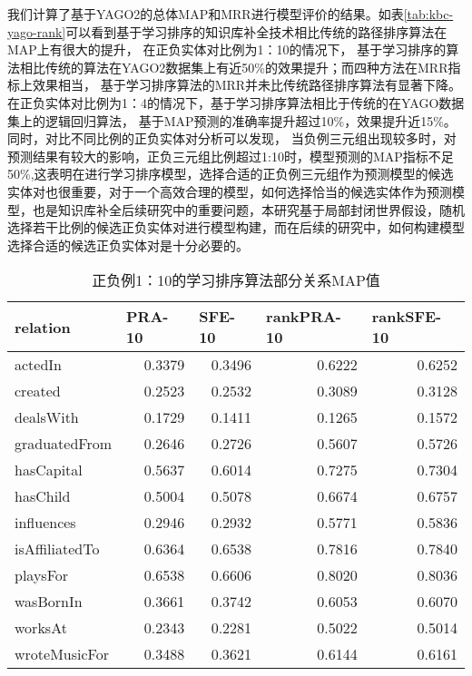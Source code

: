 我们计算了基于YAGO2的总体MAP和MRR进行模型评价的结果。如表\ref{tab:kbc-yago-rank}可以看到基于学习排序的知识库补全技术相比传统的路径排序算法在MAP上有很大的提升，
在正负实体对比例为1：10的情况下，
基于学习排序的算法相比传统的算法在YAGO2数据集上有近50\%的效果提升；而四种方法在MRR指标上效果相当，
基于学习排序算法的MRR并未比传统路径排序算法有显著下降。
在正负实体对比例为1：4的情况下，基于学习排序算法相比于传统的在YAGO数据集上的逻辑回归算法，
基于MAP预测的准确率提升超过10\%，效果提升近15\%。同时，对比不同比例的正负实体对分析可以发现，
当负例三元组出现较多时，对预测结果有较大的影响，正负三元组比例超过1:10时，模型预测的MAP指标不足50\%,这表明在进行学习排序模型，选择合适的正负例三元组作为预测模型的候选实体对也很重要，对于一个高效合理的模型，如何选择恰当的候选实体作为预测模型，也是知识库补全后续研究中的重要问题，本研究基于局部封闭世界假设，随机选择若干比例的候选正负实体对进行模型构建，而在后续的研究中，如何构建模型选择合适的候选正负实体对是十分必要的。

\begin{table}[htbp]
  \centering
  \caption{正负例1：10的学习排序算法部分关系MAP值}
    \begin{tabular}{|l|r|r|r|r|}
    \hline
    relation & \multicolumn{1}{l|}{PRA-10} & \multicolumn{1}{l|}{SFE-10} & \multicolumn{1}{l|}{rankPRA-10} & \multicolumn{1}{l|}{rankSFE-10} \\
    \hline
    actedIn & 0.3379  & 0.3496  & 0.6222  & 0.6252  \\
    \hline
    created & 0.2523  & 0.2532  & 0.3089  & 0.3128  \\
    \hline
    dealsWith & 0.1729  & 0.1411  & 0.1265  & 0.1572  \\
    \hline
    graduatedFrom & 0.2646  & 0.2726  & 0.5607  & 0.5726  \\
    \hline
    hasCapital & 0.5637  & 0.6014  & 0.7275  & 0.7304  \\
    \hline
    hasChild & 0.5004  & 0.5078  & 0.6674  & 0.6757  \\
    \hline
    influences & 0.2946  & 0.2932  & 0.5771  & 0.5836  \\
    \hline
    isAffiliatedTo & 0.6364  & 0.6538  & 0.7816  & 0.7840  \\
    \hline
    playsFor & 0.6538  & 0.6606  & 0.8020  & 0.8036  \\
    \hline
    wasBornIn & 0.3661  & 0.3742  & 0.6053  & 0.6070  \\
    \hline
    worksAt & 0.2343  & 0.2281  & 0.5022  & 0.5014  \\
    \hline
    wroteMusicFor & 0.3488  & 0.3621  & 0.6144  & 0.6161  \\
    \hline
    \end{tabular}%
  \label{kbc-yago-rank10}%
\end{table}%

